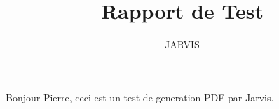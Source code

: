 \documentclass{article}
\begin{document}
\title{Rapport de Test}
\author{JARVIS}
\maketitle
Bonjour Pierre, ceci est un test de generation PDF par Jarvis.
\end{document}
